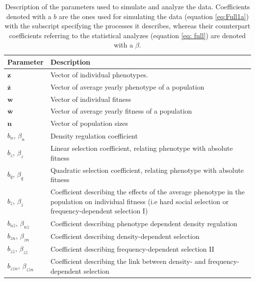 \documentclass{article}
\begin{document}
\begin{table} [h]
	\begin{singlespace}
		\begin{tabular}{|l|p{13cm}|} 
			\hline
			
			Parameter & Description \\ 
			\hline
			$\bm{z}$        & Vector of individual phenotypes. \\ 
			$\bar{\bm{z}}$  & Vector of average yearly phenotype of a population\\ 
			$\bm{w}$        & Vector of individual fitness \\ 
			$\bar{\bm{w}}$  & Vector of average yearly fitness of a population\\ 
			$\bm{n}$        & Vector of population sizes \\ 
			$b_n$, $\beta_n$              & Density regulation coefficient \\ 
			$b_z$, $\beta_z$              & Linear selection coefficient, relating phenotype with absolute fitness \\ 
			$b_q$, $\beta_q$              & Quadratic selection coefficient, relating phenotype with absolute fitness \\ 
			$b_{\bar{z}}$, $\beta_{\bar{z}}$      & Coefficient describing the effects of the average phenotype in the population on individual fitness (i.e hard social selection or frequency-dependent selection I) \\ 
			$b_{n\bar{z}}$, $\beta_{n\bar{z}}$     & Coefficient describing phenotype dependent density regulation \\ 
			$b_{zn}$, $\beta_{zn}$           & Coefficient describing density-dependent selection \\ 
			$b_{z\bar{z}}$, $\beta_{z\bar{z}}$     & Coefficient describing frequency-dependent selection II \\ 
			$b_{z\bar{z}n}$, $\beta_{z\bar{z}n}$    & Coefficient describing the link between density- and frequency-dependent selection\\ 
			\hline
		\end{tabular}
		\caption{Description of the parameters used to simulate and analyze the data. Coefficients denoted with a $b$ are the ones used for simulating the data (equation \ref{eq:Full1a}) with the subscript specifying the processes it describes, whereas their counterpart coefficients referring to the statistical analyzes (equation \ref{eq: full}) are denoted with a $\beta$.}
	\end{singlespace}
\end{table}
\end{document}
